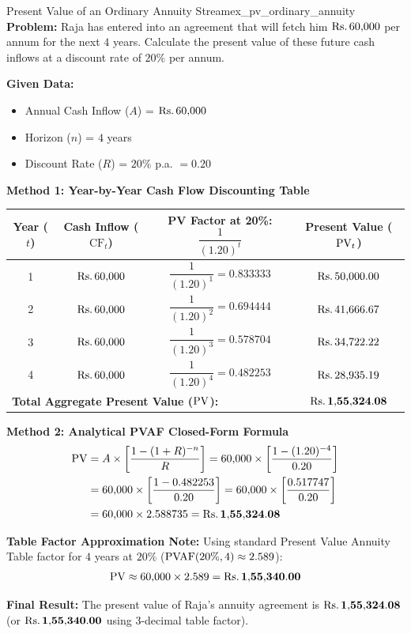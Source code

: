 \begin{example}{Present Value of an Ordinary Annuity Stream}{ex_pv_ordinary_annuity}
\textbf{Problem:}
Raja has entered into an agreement that will fetch him $\text{Rs.}\, 60{,}000$ per annum for the next $4$ years. Calculate the present value of these future cash inflows at a discount rate of $20\%$ per annum.

\tcbline
\textbf{Given Data:}
\begin{itemize}[noitemsep]
    \item Annual Cash Inflow ($A$) = $\text{Rs.}\, 60{,}000$
    \item Horizon ($n$) = $4$ years
    \item Discount Rate ($R$) = $20\%$ p.a. $= 0.20$
\end{itemize}

\textbf{Method 1: Year-by-Year Cash Flow Discounting Table}
\begin{center}
\small
\begin{tabular}{cccc}
\toprule
\textbf{Year ($t$)} & \textbf{Cash Inflow ($\text{CF}_t$)} & \textbf{PV Factor at 20\%: $\dfrac{1}{(1.20)^t}$} & \textbf{Present Value ($\operatorname{PV}_t$)} \\
\midrule
1 & $\text{Rs.}\, 60{,}000$ & $\dfrac{1}{(1.20)^1} = 0.833333$ & $\text{Rs.}\, 50{,}000.00$ \\[0.4em]
2 & $\text{Rs.}\, 60{,}000$ & $\dfrac{1}{(1.20)^2} = 0.694444$ & $\text{Rs.}\, 41{,}666.67$ \\[0.4em]
3 & $\text{Rs.}\, 60{,}000$ & $\dfrac{1}{(1.20)^3} = 0.578704$ & $\text{Rs.}\, 34{,}722.22$ \\[0.4em]
4 & $\text{Rs.}\, 60{,}000$ & $\dfrac{1}{(1.20)^4} = 0.482253$ & $\text{Rs.}\, 28{,}935.19$ \\
\midrule
\multicolumn{3}{l}{\textbf{Total Aggregate Present Value ($\operatorname{PV}$):}} & $\mathbf{\text{Rs.}\, 1{,}55{,}324.08}$ \\
\bottomrule
\end{tabular}
\end{center}

\textbf{Method 2: Analytical PVAF Closed-Form Formula}
\begin{align*}
    \operatorname{PV} &= A \times \left[ \frac{1 - (1 + R)^{-n}}{R} \right] = 60{,}000 \times \left[ \frac{1 - (1.20)^{-4}}{0.20} \right] \\
    &= 60{,}000 \times \left[ \frac{1 - 0.482253}{0.20} \right] = 60{,}000 \times \left[ \frac{0.517747}{0.20} \right] \\
    &= 60{,}000 \times 2.588735 = \mathbf{\text{Rs.}\, 1{,}55{,}324.08}
\end{align*}

\textbf{Table Factor Approximation Note:}
Using standard Present Value Annuity Table factor for $4$ years at $20\%$ ($\operatorname{PVAF}(20\%, 4) \approx 2.589$):
\begin{equation*}
    \operatorname{PV} \approx 60{,}000 \times 2.589 = \mathbf{\text{Rs.}\, 1{,}55{,}340.00}
\end{equation*}

\textbf{Final Result:}
The present value of Raja's annuity agreement is $\mathbf{\text{Rs.}\, 1{,}55{,}324.08}$ (or $\mathbf{\text{Rs.}\, 1{,}55{,}340.00}$ using 3-decimal table factor).
\end{example}

